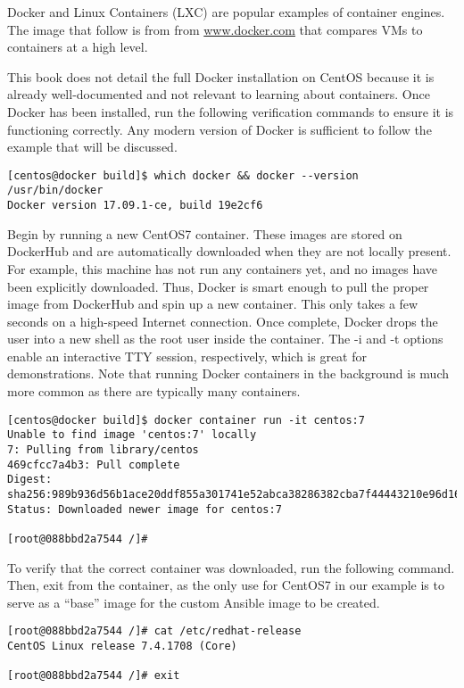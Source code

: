 Docker and Linux Containers (LXC) are popular examples of container engines.
The image that follow is from from \url{www.docker.com} that compares VMs to
containers at a high
level.


This book does not detail the full Docker installation on CentOS because it is
already well-documented and not relevant to learning about containers. Once
Docker has been installed, run the following verification commands to ensure
it is functioning correctly. Any modern version of Docker is sufficient to
follow the example that will be discussed.

\begin{verbatim}
[centos@docker build]$ which docker && docker --version
/usr/bin/docker
Docker version 17.09.1-ce, build 19e2cf6
\end{verbatim}


Begin by running a new CentOS7 container. These images are stored on DockerHub
and are automatically downloaded when they are not locally present. For
example, this machine has not run any containers yet, and no images have been
explicitly downloaded. Thus, Docker is smart enough to pull the proper image
from DockerHub and spin up a new container. This only takes a few seconds on a
high-speed Internet connection. Once complete, Docker drops the user into a
new shell as the root user inside the container. The -i and -t options enable
an interactive TTY session, respectively, which is great for demonstrations.
Note that running Docker containers in the background is much more common as
there are typically many containers.

\begin{verbatim}
[centos@docker build]$ docker container run -it centos:7
Unable to find image 'centos:7' locally
7: Pulling from library/centos
469cfcc7a4b3: Pull complete 
Digest: sha256:989b936d56b1ace20ddf855a301741e52abca38286382cba7f44443210e96d16
Status: Downloaded newer image for centos:7

[root@088bbd2a7544 /]# 
\end{verbatim}

To verify that the correct container was downloaded, run the following
command. Then, exit from the container, as the only use for CentOS7 in our
example is to serve as a ``base'' image for the custom Ansible image to be
created.

\begin{verbatim}
[root@088bbd2a7544 /]# cat /etc/redhat-release 
CentOS Linux release 7.4.1708 (Core) 

[root@088bbd2a7544 /]# exit
\end{verbatim}

